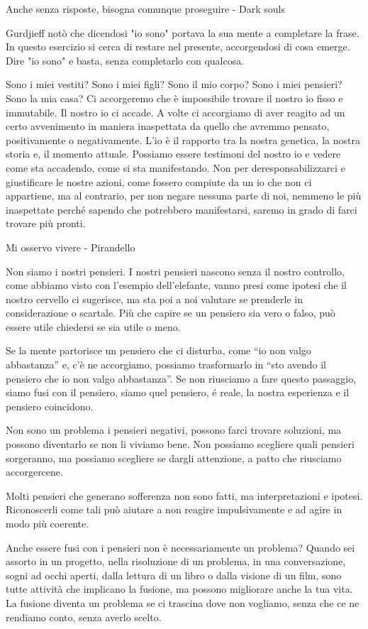\documentclass[12pt]{book} %
\begin{document}
Anche senza risposte, bisogna comunque proseguire - Dark souls

Gurdjieff notò che dicendosi "io sono" portava la sua mente a completare la frase. In questo esercizio si cerca di restare nel presente, accorgendosi di cosa emerge. Dire "io sono" e basta, senza completarlo con qualcosa.

Sono i miei vestiti? Sono i miei figli? Sono il mio corpo? Sono i miei pensieri? Sono la mia casa? Ci accorgeremo che è impossibile trovare il nostro io fisso e immutabile. Il nostro io ci accade. A volte ci accorgiamo di aver reagito ad un
certo avvenimento in maniera inaspettata da quello che avremmo pensato, positivamente o negativamente. L'io è il rapporto tra la nostra genetica, la nostra storia e, il momento attuale. Possiamo essere testimoni del nostro io e vedere come sta accadendo, come si sta manifestando. Non per deresponsabilizzarci e giustificare le nostre azioni, come fossero compiute da un io che non ci appartiene, ma al contrario, per non negare nessuna parte di noi, nemmeno le più inaspettate perché sapendo che potrebbero manifestarsi, saremo in grado di farci trovare più pronti.

Mi osservo vivere - Pirandello

Non siamo i nostri pensieri. I nostri pensieri nascono senza il nostro controllo, come abbiamo visto con l'esempio dell'elefante, vanno presi come ipotesi che il nostro cervello ci sugerisce, ma sta poi a noi valutare se prenderle in considerazione o scartale. Più che capire se un pensiero sia vero o falso, può essere utile chiedersi se sia utile o meno. 

Se la mente partorisce un pensiero che ci disturba, come “io non valgo abbastanza” e, c'è ne accorgiamo, possiamo trasformarlo in “sto avendo il pensiero che io non valgo abbastanza”.
Se non riusciamo a fare questo passaggio, siamo fusi con il pensiero, siamo quel pensiero, é reale, la nostra esperienza e il pensiero coincidono.

Non sono un problema i pensieri negativi, possono farci trovare soluzioni, ma possono diventarlo se non li viviamo bene. Non possiamo scegliere quali pensieri sorgeranno, ma possiamo scegliere se dargli attenzione, a patto che riusciamo accorgercene.

Molti pensieri che generano sofferenza non sono fatti, ma interpretazioni e ipotesi. Riconoscerli come tali può aiutare a non reagire impulsivamente e ad agire in modo più coerente. 

Anche essere fusi con i pensieri non è necessariamente un problema? Quando sei assorto in un progetto, nella risoluzione di un problema, in una conversazione, sogni ad occhi aperti, dalla lettura di un libro o dalla visione di un film, sono tutte
attività che implicano la fusione, ma possono migliorare anche la tua vita. La fusione diventa un problema se ci trascina dove non vogliamo, senza che ce ne rendiamo conto, senza averlo scelto.
\end{document}
